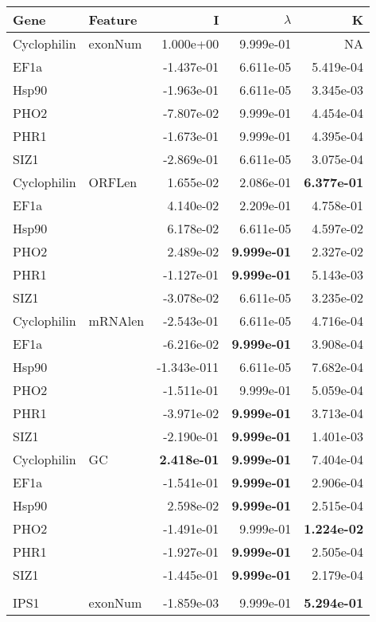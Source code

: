 \documentclass[varwidth,convert]{standalone}
\begin{document}
\begin{tabular}{llrrr}
\toprule
Gene & Feature & I  & $\lambda$  & K  \\ 
\midrule
Cyclophilin & exonNum &  1.000e+00  & 9.999e-01 &        NA \\ 
EF1a &  & -1.437e-01 & 6.611e-05  & 5.419e-04  \\ 
Hsp90 & & -1.963e-01  & 6.611e-05  & 3.345e-03  \\ 
PHO2 &  & -7.807e-02  & 9.999e-01  & 4.454e-04  \\ 
PHR1 &  & -1.673e-01  & 9.999e-01  & 4.395e-04  \\ 
SIZ1 &  & -2.869e-01  & 6.611e-05  & 3.075e-04  \\ 
Cyclophilin & ORFLen &  1.655e-02 & 2.086e-01  & \textbf{6.377e-01}  \\ 
EF1a &  &  4.140e-02  & 2.209e-01  & 4.758e-01  \\ 
Hsp90 & &  6.178e-02  & 6.611e-05  & 4.597e-02  \\ 
PHO2 &  &  2.489e-02  & \textbf{9.999e-01}  & 2.327e-02  \\ 
PHR1 &  & -1.127e-01  & \textbf{9.999e-01}  & 5.143e-03  \\ 
SIZ1 &  & -3.078e-02  & 6.611e-05  & 3.235e-02  \\ 
Cyclophilin & mRNAlen & -2.543e-01  & 6.611e-05  & 4.716e-04 \\ 
EF1a &  & -6.216e-02  & \textbf{9.999e-01}  & 3.908e-04  \\ 
Hsp90 & & -1.343e-011& 6.611e-05  & 7.682e-04  \\ 
PHO2 &  & -1.511e-01  & 9.999e-01  & 5.059e-04  \\ 
PHR1 &  & -3.971e-02  & \textbf{9.999e-01}  & 3.713e-04  \\ 
SIZ1 &  & -2.190e-01  & \textbf{9.999e-01}  & 1.401e-03  \\ 
Cyclophilin & GC &  \textbf{2.418e-01} &  \textbf{9.999e-01} &  7.404e-04  \\ 
EF1a & & -1.541e-01  & \textbf{9.999e-01}  & 2.906e-04  \\ 
Hsp90 &  &  2.598e-02  & \textbf{9.999e-01} &  2.515e-04  \\ 
PHO2 &  & -1.491e-01  & 9.999e-01 & \textbf{1.224e-02}  \\ 
PHR1 &  & -1.927e-01  & \textbf{9.999e-01} & 2.505e-04  \\ 
SIZ1 &  & -1.445e-01  & \textbf{9.999e-01} & 2.179e-04  \\ 
\\
IPS1 & exonNum & -1.859e-03  & 9.999e-01 & \textbf{5.294e-01}  \\ 

\end{tabular}
\end{document}
